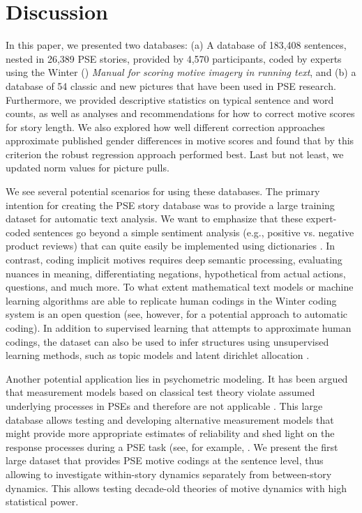 \documentclass[man,a4paper,mask]{apa6}\usepackage[]{graphicx}\usepackage[]{color}
\begin{document}
\section{Discussion}

In this paper, we presented two databases: (a) A database of 183,408 sentences, nested in 26,389 PSE stories, provided by 4,570 participants, coded by experts using the Winter (\citeyear{winter_ManualScoringMotive_1994}) \emph{Manual for scoring motive imagery in running text}, and (b) a database of 54 classic and new pictures that have been used in PSE research. Furthermore, we provided descriptive statistics on typical sentence and word counts, as well as analyses and recommendations for how to correct motive scores for story length. 
We also explored how well different correction approaches approximate published gender differences in motive scores and found that by this criterion the robust regression approach performed best.
Last but not least, we updated norm values for picture pulls.

We see several potential scenarios for using these databases. The primary intention for creating the PSE story database was to provide a large training dataset for automatic text analysis. We want to emphasize that these expert-coded sentences go beyond a simple sentiment analysis (e.g., positive vs. negative product reviews) that can quite easily be implemented using dictionaries \parencite[e.g.,][]{feldman_TechniquesApplicationsSentiment_2013}. In contrast, coding implicit motives requires deep semantic processing, evaluating nuances in meaning, differentiating negations, hypothetical from actual actions, questions, and much more. To what extent mathematical text models or machine learning algorithms are able to replicate human codings in the Winter coding system is an open question (see, however,  for a potential approach to automatic coding). In addition to supervised learning that attempts to approximate human codings, the dataset can also be used to infer structures using unsupervised learning methods, such as topic models and latent dirichlet allocation \parencite{blei_LatentDirichletAllocation_2003}.

Another potential application lies in psychometric modeling. It has been argued that measurement models based on classical test theory violate assumed underlying processes in PSEs and therefore are not applicable \parencite{atkinson_studying_1981,hibbard_critique_2003,schultheiss_reliability_2008}. This large database allows testing and developing alternative measurement models that might provide more appropriate estimates of reliability and shed light on the response processes during a PSE task (see, for example, . We present the first large dataset that provides PSE motive codings at the sentence level, thus allowing to investigate within-story dynamics separately from between-story dynamics. This allows testing decade-old theories of motive dynamics with high statistical power. 
\end{document}
